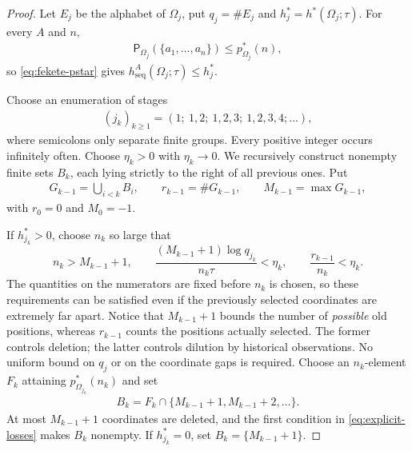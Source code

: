 \documentclass[11pt,reqno]{amsart}
\numberwithin{equation}{section}
\theoremstyle{definition}
\newcommand{\Patt}{\mathsf P}
\newcommand{\hseq}{h_{\mathrm{seq}}}
\newcommand{\hpat}{h^{*}}
\begin{document}
\begin{proof}
Let $E_j$ be the alphabet of $\Omega_j$, put $q_j=\#E_j$ and
$h_j^*=\hpat(\Omega_j;\tau)$.  For every $A$ and $n$,
\begin{align*}
 \Patt_{\Omega_j}(\{a_1,\ldots,a_n\})\le p_{\Omega_j}^*(n),
\end{align*}
so \eqref{eq:fekete-pstar} gives
$\hseq^A(\Omega_j;\tau)\le h_j^*$.

Choose an enumeration of stages
\begin{align*}
 (j_k)_{k\ge1}=(1;\ 1,2;\ 1,2,3;\ 1,2,3,4;\ldots),
\end{align*}
where semicolons only separate finite groups. Every positive integer
occurs infinitely often. Choose $\eta_k>0$ with $\eta_k\to0$.  We recursively
construct nonempty finite sets $B_k$, each lying strictly to the right of all
previous ones.  Put
\begin{align*}
 G_{k-1}=\bigcup_{i<k}B_i,
 \qquad r_{k-1}=\#G_{k-1},
 \qquad M_{k-1}=\max G_{k-1},
\end{align*}
with $r_0=0$ and $M_0=-1$.

If $h_{j_k}^*>0$, choose $n_k$ so large that
\begin{equation}\label{eq:explicit-losses}
 n_k>M_{k-1}+1,
 \qquad
 \frac{(M_{k-1}+1)\log q_{j_k}}{n_k\tau}<\eta_k,
 \qquad
 \frac{r_{k-1}}{n_k}<\eta_k.
\end{equation}
The quantities on the numerators are fixed before $n_k$ is chosen,
so these requirements can be satisfied even if the previously selected
coordinates are extremely far apart. Notice that $M_{k-1}+1$ bounds the
number of \emph{possible} old positions, whereas $r_{k-1}$ counts the
positions actually selected. The former controls deletion; the latter
controls dilution by historical observations. No uniform bound on $q_j$
or on the coordinate gaps is required. Choose an
$n_k$-element $F_k$ attaining $p_{\Omega_{j_k}}^*(n_k)$ and set
\begin{align*}
 B_k=F_k\cap\{M_{k-1}+1,M_{k-1}+2,\ldots\}.
\end{align*}
At most $M_{k-1}+1$ coordinates are deleted, and the first condition in
\eqref{eq:explicit-losses} makes $B_k$ nonempty.  If $h_{j_k}^*=0$, set
$B_k=\{M_{k-1}+1\}$.


\end{proof}
\end{document}
